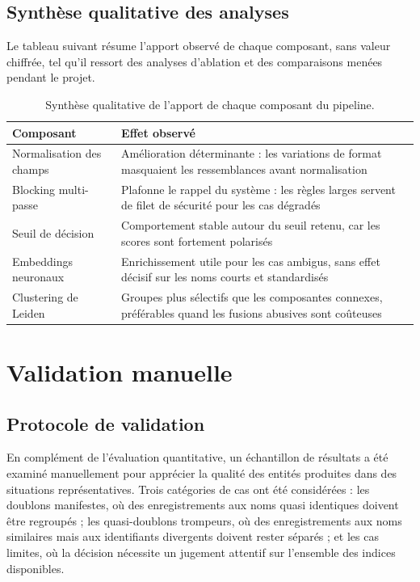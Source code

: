 \subsection{Synthèse qualitative des analyses}

Le tableau suivant résume l'apport observé de chaque composant, sans valeur chiffrée, tel qu'il ressort des analyses d'ablation et des comparaisons menées pendant le projet.

\begin{table}[H]
\centering
\caption{Synthèse qualitative de l'apport de chaque composant du pipeline.}
\renewcommand{\arraystretch}{1.3}
\setlength{\tabcolsep}{3pt}
{\small
\begin{tabular}{|p{3.6cm}|p{10.0cm}|}
\hline
\textbf{Composant} & \textbf{Effet observé} \\
\hline
Normalisation des champs & Amélioration déterminante : les variations de format masquaient les ressemblances avant normalisation \\
\hline
Blocking multi-passe & Plafonne le rappel du système : les règles larges servent de filet de sécurité pour les cas dégradés \\
\hline
Seuil de décision & Comportement stable autour du seuil retenu, car les scores sont fortement polarisés \\
\hline
Embeddings neuronaux & Enrichissement utile pour les cas ambigus, sans effet décisif sur les noms courts et standardisés \\
\hline
Clustering de Leiden & Groupes plus sélectifs que les composantes connexes, préférables quand les fusions abusives sont coûteuses \\
\hline
\end{tabular}
}
\end{table}

\section{Validation manuelle}

\subsection{Protocole de validation}

En complément de l'évaluation quantitative, un échantillon de résultats a été examiné manuellement pour apprécier la qualité des entités produites dans des situations représentatives. Trois catégories de cas ont été considérées : les doublons manifestes, où des enregistrements aux noms quasi identiques doivent être regroupés ; les quasi-doublons trompeurs, où des enregistrements aux noms similaires mais aux identifiants divergents doivent rester séparés ; et les cas limites, où la décision nécessite un jugement attentif sur l'ensemble des indices disponibles.

